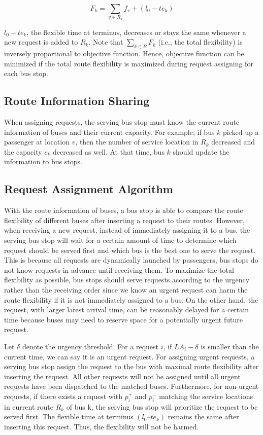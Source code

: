 \documentclass[runningheads]{llncs}
\begin{document}
\begin{equation}
F_k = \sum_{v\in R_k}{f_v} + (l_0 - te_k)
\end{equation}

$l_0 - te_k$, the flexible time at terminus, decreases or stays the same whenever a new request is added to $R_k$. Note that $\sum_{k\in B}{F_k}$ (i.e., the total flexibility) is inversely proportional to objective function. Hence, objective function can be minimized if the total route flexibility is maximized during request assigning for each bus stop.

\subsection{Route Information Sharing}
When assigning requests, the serving bus stop must know the current route information of buses and their current capacity. For example, if bus $k$ picked up a passenger at location $v$, then the number of service location in $R_k$ decreased and the capacity $c_k$ decreased as well. At that time, bus $k$ should update the information to bus stops.

\subsection{Request Assignment Algorithm}
With the route information of buses, a bus stop is able to compare the route flexibility of different buses after inserting a request to their routes. However, when receiving a new request, instead of immediately assigning it to a bus, the serving bus stop will wait for a certain amount of time to determine which request should be served first and which bus is the best one to serve the request. This is because all requests are dynamically launched by passengers, bus stops do not know requests in advance until receiving them. To maximize the total flexibility as possible, bus stops should serve requests according to the urgency rather than the receiving order since we know an urgent request can harm the route flexibility if it is not immediately assigned to a bus. On the other hand, the request, with larger latest arrival time, can be reasonably delayed for a certain time because buses may need to reserve space for a potentially urgent future request.

Let $\delta$ denote the urgency threshold. For a request $i$, if $LA_i - \delta$ is smaller than the current time, we can say it is an urgent request. For assigning urgent requests, a serving bus stop assign the request to the bus with maximal route flexibility after inserting the request. All other requests will not be assigned until all urgent requests have been dispatched to the matched buses. Furthermore, for non-urgent requests, if there exists a request with $p_i^+$ and $p_i^-$ matching the service locations in current route $R_k$ of bus k, the serving bus stop will prioritize the request to be served first. The flexible time at terminus $(l_0 – te_k)$ remains the same after inserting this request. Thus, the flexibility will not be harmed.
\end{document}
